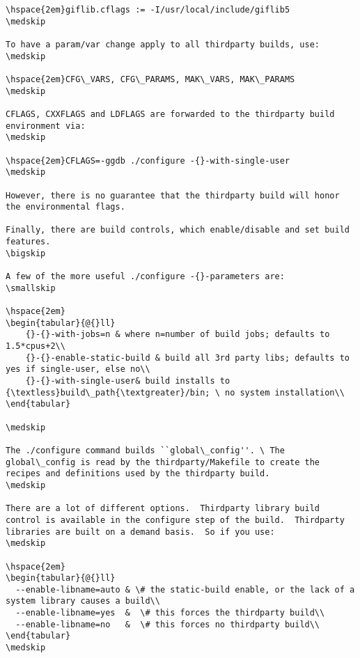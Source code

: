 \begin{lstlisting}[numbers=none]
\hspace{2em}giflib.cflags := -I/usr/local/include/giflib5
\medskip

To have a param/var change apply to all thirdparty builds, use:
\medskip

\hspace{2em}CFG\_VARS, CFG\_PARAMS, MAK\_VARS, MAK\_PARAMS
\medskip

CFLAGS, CXXFLAGS and LDFLAGS are forwarded to the thirdparty build environment via:
\medskip

\hspace{2em}CFLAGS=-ggdb ./configure -{}-with-single-user
\medskip

However, there is no guarantee that the thirdparty build will honor the environmental flags.

Finally, there are build controls, which enable/disable and set build features.
\bigskip

A few of the more useful ./configure -{}-parameters are:
\smallskip

\hspace{2em}
\begin{tabular}{@{}ll}
	{}-{}-with-jobs=n & where n=number of build jobs; defaults to 1.5*cpus+2\\
	{}-{}-enable-static-build & build all 3rd party libs; defaults to yes if single-user, else no\\
	{}-{}-with-single-user& build installs to {\textless}build\_path{\textgreater}/bin; \ no system installation\\
\end{tabular}

\medskip

The ./configure command builds ``global\_config''. \ The global\_config is read by the thirdparty/Makefile to create the recipes and definitions used by the thirdparty build.
\medskip

There are a lot of different options.  Thirdparty library build control is available in the configure step of the build.  Thirdparty libraries are built on a demand basis.  So if you use:
\medskip

\hspace{2em}
\begin{tabular}{@{}ll}
  --enable-libname=auto & \# the static-build enable, or the lack of a system library causes a build\\
  --enable-libname=yes  &  \# this forces the thirdparty build\\
  --enable-libname=no   &  \# this forces no thirdparty build\\
\end{tabular}
\medskip


\end{lstlisting}
